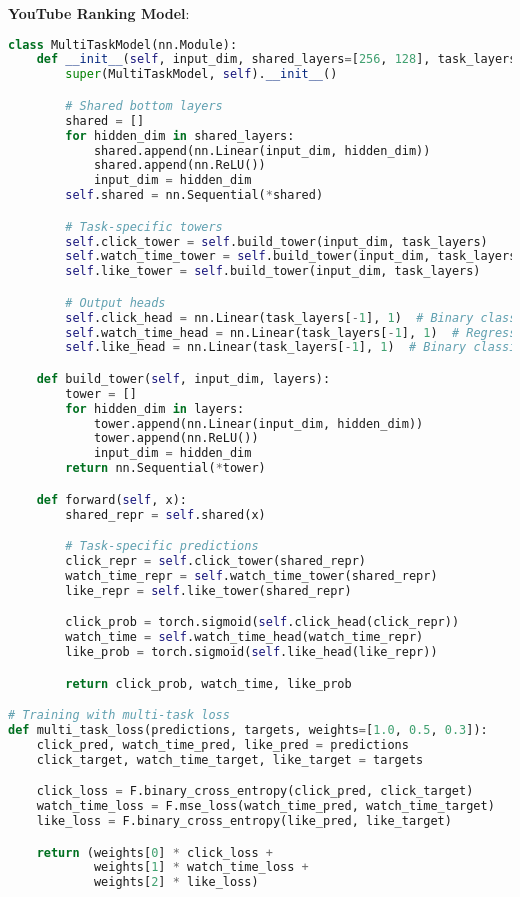 \documentclass[10pt]{article}
\begin{document}
\textbf{YouTube Ranking Model}:
\begin{lstlisting}[language=Python]
class MultiTaskModel(nn.Module):
    def __init__(self, input_dim, shared_layers=[256, 128], task_layers=[64, 32]):
        super(MultiTaskModel, self).__init__()

        # Shared bottom layers
        shared = []
        for hidden_dim in shared_layers:
            shared.append(nn.Linear(input_dim, hidden_dim))
            shared.append(nn.ReLU())
            input_dim = hidden_dim
        self.shared = nn.Sequential(*shared)

        # Task-specific towers
        self.click_tower = self.build_tower(input_dim, task_layers)
        self.watch_time_tower = self.build_tower(input_dim, task_layers)
        self.like_tower = self.build_tower(input_dim, task_layers)

        # Output heads
        self.click_head = nn.Linear(task_layers[-1], 1)  # Binary classification
        self.watch_time_head = nn.Linear(task_layers[-1], 1)  # Regression
        self.like_head = nn.Linear(task_layers[-1], 1)  # Binary classification

    def build_tower(self, input_dim, layers):
        tower = []
        for hidden_dim in layers:
            tower.append(nn.Linear(input_dim, hidden_dim))
            tower.append(nn.ReLU())
            input_dim = hidden_dim
        return nn.Sequential(*tower)

    def forward(self, x):
        shared_repr = self.shared(x)

        # Task-specific predictions
        click_repr = self.click_tower(shared_repr)
        watch_time_repr = self.watch_time_tower(shared_repr)
        like_repr = self.like_tower(shared_repr)

        click_prob = torch.sigmoid(self.click_head(click_repr))
        watch_time = self.watch_time_head(watch_time_repr)
        like_prob = torch.sigmoid(self.like_head(like_repr))

        return click_prob, watch_time, like_prob

# Training with multi-task loss
def multi_task_loss(predictions, targets, weights=[1.0, 0.5, 0.3]):
    click_pred, watch_time_pred, like_pred = predictions
    click_target, watch_time_target, like_target = targets

    click_loss = F.binary_cross_entropy(click_pred, click_target)
    watch_time_loss = F.mse_loss(watch_time_pred, watch_time_target)
    like_loss = F.binary_cross_entropy(like_pred, like_target)

    return (weights[0] * click_loss +
            weights[1] * watch_time_loss +
            weights[2] * like_loss)
\end{lstlisting}
\end{document}
